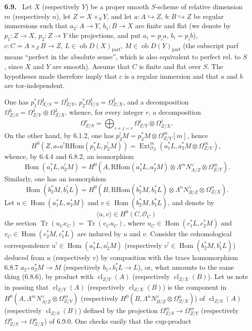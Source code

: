 \documentclass[11pt]{article}
\newenvironment{statement}[1]{\par\medskip\noindent\textbf{#1.}\ }{\par\medskip}
\DeclareMathOperator{\Hom}{Hom}
\DeclareMathOperator{\Ext}{Ext}
\newcommand{\ob}{\operatorname{ob}}
\providecommand{\RHom}{\mathrm{RHom}}
\providecommand{\cl}{\operatorname{cl}}
\providecommand{\Tr}{\operatorname{Tr}}
\providecommand{\parf}{\mathrm{parf}}
\providecommand{\OO}{\mathcal O}
\begin{document}
\begin{statement}{6.9}
Let $X$ (respectively $Y$) be a proper smooth $S$-scheme of relative dimension $m$ (respectively $n$), let $Z=X\times_SY$, and let $a:A\hookrightarrow Z$, $b:B\hookrightarrow Z$ be regular immersions such that $a_2:A\to Y$, $b_1:B\to X$ are finite and flat (we denote by $p_1:Z\to X$, $p_2:Z\to Y$ the projections, and put $a_i=p_ia$, $b_i=p_ib$), $c:C=A\times_ZB\to Z$, $L\in\ob D(X)_{\parf}$, $M\in\ob D(Y)_{\parf}$ (the subscript parf means ``perfect in the absolute sense'', which is also equivalent to perfect rel. to $S$, since $X$ and $Y$ are smooth). Assume that $C$ is finite and flat over $S$. The hypotheses made therefore imply that $c$ is a regular immersion and that $a$ and $b$ are tor-independent.

One has $p_1^*\Omega^1_{X/S}=\Omega^1_{Z/Y}$, $p_2^*\Omega^1_{Y/S}=\Omega^1_{Z/X}$, and a decomposition $\Omega^1_{Z/S}=\Omega^1_{Z/Y}\oplus\Omega^1_{Z/X}$, whence, for every integer $r$, a decomposition
\begin{equation}
\tag{6.9.0}
\Omega^r_{Z/S}=\bigoplus_{i+j=r}\Omega^i_{Z/Y}\otimes\Omega^j_{Z/X}.
\end{equation}
On the other hand, by 6.1.2, one has $p_2^!M=p_2^*M\otimes\Omega^m_{Z/Y}[m]$, hence
\[
H^0(Z,a_*a^!\RHom(p_1^*L,p_2^!M))=
\Ext^m_{\OO_Z}(a_1^*L,a_2^*M\otimes\Omega^m_{Z/Y}),
\]
whence, by 6.4.4 and 6.8.2, an isomorphism
\begin{equation}
\tag{6.9.1}
\Hom(a_1^*L,a_2^!M)=H^0(A,\RHom(a_1^*L,a_2^*M)\otimes\Lambda^mN^\vee_{A/Z}\otimes\Omega^m_{Z/Y}).
\end{equation}
Similarly, one has an isomorphism
\begin{equation}
\tag{6.9.2}
\Hom(b_2^*M,b_1^!L)=H^0(B,\RHom(b_2^*M,b_1^*L)\otimes\Lambda^nN^\vee_{B/Z}\otimes\Omega^n_{Z/X}).
\end{equation}
Let $u\in\Hom(a_1^*L,a_2^*M)$ and $v\in\Hom(b_2^*M,b_1^*L)$, and denote by
\begin{equation}
\tag{6.9.3}
\langle u,v\rangle\in H^0(C,\OO_C)
\end{equation}
the section $\Tr(u_Cv_C)=\Tr(v_Cu_C)$, where $u_C\in\Hom(c_1^*L,c_2^*M)$ and $v_C\in\Hom(c_2^*M,c_1^*L)$ are induced by $u$ and $v$. Consider the cohomological correspondence $u^!\in\Hom(a_1^*L,a_2^!M)$ (respectively $v^!\in\Hom(b_2^*M,b_1^!L)$) deduced from $u$ (respectively $v$) by composition with the trace homomorphism 6.8.7 $a_{2*}a_2^*M\to M$ (respectively $b_{1*}b_1^*L\to L$), or, what amounts to the same thing (6.8.6), by product with $\cl_{Z/Y}(A)$ (respectively $\cl_{Z/X}(B)$). Let us note in passing that $\cl_{Z/Y}(A)$ (respectively $\cl_{Z/X}(B)$) is the component in $H^0(A,\Lambda^mN^\vee_{A/Z}\otimes\Omega^m_{Z/Y})$ (respectively $H^0(B,\Lambda^nN^\vee_{B/Z}\otimes\Omega^n_{Z/X})$) of $\cl_{Z/S}(A)$ (respectively $\cl_{Z/S}(B)$) defined by the projection $\Omega^m_{Z/S}\to\Omega^m_{Z/Y}$ (respectively $\Omega^n_{Z/S}\to\Omega^n_{Z/X}$) of 6.9.0. One checks easily that the cup-product

\end{statement}
\end{document}
